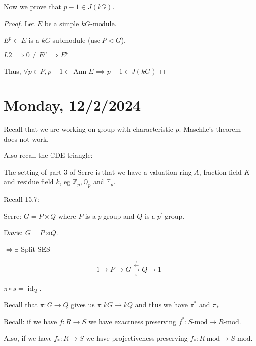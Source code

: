\documentclass{article}
\theoremstyle{definition}
\begin{document}
Now we prove that \(p-1\in J(kG)\).

\begin{proof}
    Let \(E\) be a simple \(kG\)-module.

    \(E^p \subset E\) is a \(kG\)-submodule (use \(P \triangleleft G\)).

    \(L2 \implies 0 \neq E^p \implies E^p = \) 
    
    Thus, \(\forall p\in P, p-1 \in \operatorname{Ann} E \implies p-1\in J(kG)\) 
\end{proof}

\section*{Monday, 12/2/2024}

Recall that we are working on group with characteristic \(p\). Maschke's theorem does not work.

Also recall the CDE triangle:

\begin{center}
\end{center}

The setting of part 3 of Serre is that we have a valuation ring \(A\), fraction field \(K\) and residue field \(k\), eg \(\mathbb{Z}_p, \mathbb{Q}_p\) and \(\mathbb{F}_p\).

Recall 15.7:

Serre: \(G = P \times Q\) where \(P\) is a \(p\) group and \(Q\) is a \(p^{\prime}\) group.

Davis: \(G = P \rtimes Q\).

\(\iff \exists\) Split SES:

\[
    1 \to P \to G \underset{\pi}{\overset{\overset{s}{\leftarrow}}{\to}}  Q \to 1
\]

\(\pi \circ s = \operatorname{id}_{Q}\).

Recall that \(\pi: G\to Q\) gives us \(\pi: kG \to kQ\) and thus we have \(\pi^{\ast}\) and \(\pi_{\ast}\) 

Recall: if we have \(f:R\to S\) we have exactness preserving \(f^{\ast}:S\text{-mod} \to R\text{-mod}\).

Also, if we have \(f_{\ast}:R\to S\) we have projectiveness preserving \(f_{\ast}:R\text{-mod} \to S\text{-mod}\).
\end{document}
